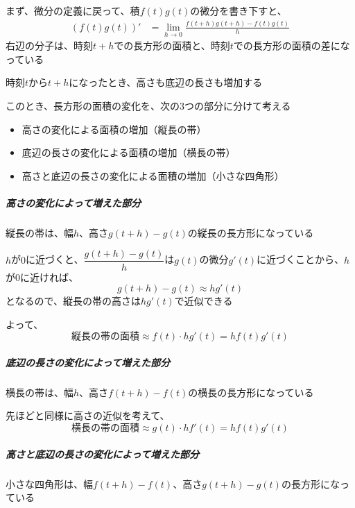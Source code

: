 \documentclass[../book_jiriki_calc]{subfiles}
\begin{document}
まず、微分の定義に戻って、積$f(t)g(t)$の微分を書き下すと、
\begin{align}
  (f(t)g(t))' & = \lim_{h \to 0} \frac{f(t+h)g(t+h) - f(t)g(t)}{h}
\end{align}
右辺の分子は、時刻$t+h$での長方形の面積と、時刻$t$での長方形の面積の差になっている

\br

時刻$t$から$t+h$になったとき、高さも底辺の長さも増加する

このとき、長方形の面積の変化を、次の3つの部分に分けて考える
\begin{itemize}
  \item 高さの変化による面積の増加（縦長の帯）
  \item 底辺の長さの変化による面積の増加（横長の帯）
  \item 高さと底辺の長さの変化による面積の増加（小さな四角形）
\end{itemize}

\sectionline

\subparagraph{高さの変化によって増えた部分}\quad

縦長の帯は、幅$h$、高さ$g(t+h)-g(t)$の縦長の長方形になっている

\br

$h$が$0$に近づくと、$\dfrac{g(t+h)-g(t)}{h}$は$g(t)$の微分$g'(t)$に近づくことから、$h$が$0$に近ければ、
\begin{equation}
  g(t+h)-g(t) \approx hg'(t)
\end{equation}
となるので、縦長の帯の高さは$hg'(t)$で近似できる

\br

よって、
\begin{equation}
  \text{縦長の帯の面積} \approx f(t) \cdot hg'(t) = hf(t)g'(t)
\end{equation}

\sectionline

\subparagraph{底辺の長さの変化によって増えた部分}\quad

横長の帯は、幅$h$、高さ$f(t+h)-f(t)$の横長の長方形になっている

先ほどと同様に高さの近似を考えて、
\begin{equation}
  \text{横長の帯の面積} \approx g(t) \cdot hf'(t) = hf(t)g'(t)
\end{equation}

\sectionline

\subparagraph{高さと底辺の長さの変化によって増えた部分}\quad

小さな四角形は、幅$f(t+h)-f(t)$、高さ$g(t+h)-g(t)$の長方形になっている
\end{document}
